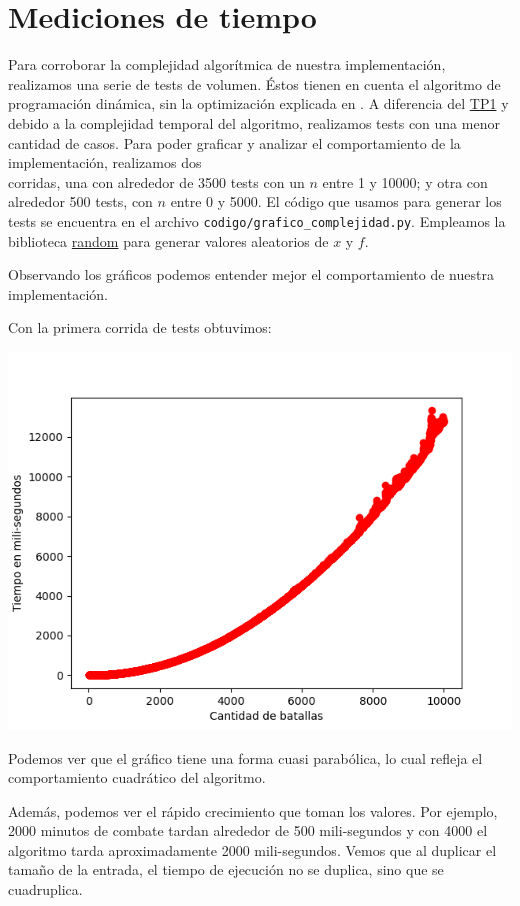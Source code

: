 \documentclass{article}
\begin{document}
\section{Mediciones de tiempo}
\label{sec:medTiempo}
Para corroborar la complejidad algorítmica de nuestra implementación, realizamos una serie de tests de volumen. Éstos tienen en cuenta el algoritmo de programación dinámica, sin la optimización explicada en . A diferencia del \href{https://github.com/La-sociedad-del-silencio/TP1-Greedy}{TP1} y debido a la complejidad temporal del algoritmo, realizamos tests con una menor cantidad de casos.
Para poder graficar y analizar el comportamiento de la implementación, realizamos dos \\corridas, una con alrededor de 3500 tests con un $n$ entre  1 y 10000; y otra con alrededor 500 tests, con $n$ entre 0 y 5000. El código que usamos para generar los tests se encuentra en el archivo \texttt{codigo/grafico\_complejidad.py}. Empleamos la biblioteca \href{https://docs.python.org/es/3/library/random.html}{random} para generar valores aleatorios de $x$ y $f$.

Observando los gráficos podemos entender mejor el comportamiento de nuestra implementación. 

Con la primera corrida de tests obtuvimos:

\includegraphics[scale=0.69]{graficoComplejidadVintage.png}

Podemos ver que el gráfico tiene una forma cuasi parabólica, lo cual refleja el comportamiento cuadrático del algoritmo.

Además, podemos ver el rápido crecimiento que toman los valores. Por ejemplo, 2000 minutos de combate tardan alrededor de 500 mili-segundos y con 4000 el algoritmo tarda aproximadamente 2000 mili-segundos. Vemos que al duplicar el tamaño de la entrada, el tiempo de ejecución no se duplica, sino que se cuadruplica.
\end{document}
